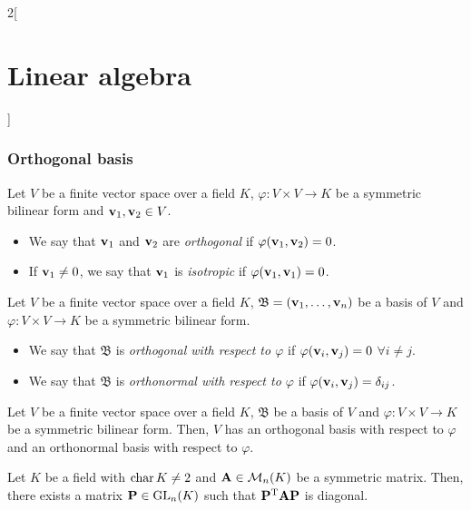 \documentclass[../../../main.tex]{subfiles}
\begin{document}
\begin{multicols}{2}[\section{Linear algebra}]
  \subsubsection*{Orthogonal basis}
  \begin{definition}\label{ALG-isotrop}
    Let $V$ be a finite vector space over a field $K$, $\varphi:V\times V\rightarrow K$ be a symmetric bilinear form and $\vb{v}_1,\vb{v}_2\in V$.
    \begin{itemize}
      \item We say that $\vb{v}_1$ and $\vb{v}_2$ are \textit{orthogonal} if $\varphi(\vb{v}_1,\vb{v}_2)=0$.
      \item If $\vb{v}_1\ne 0$, we say that $\vb{v}_1$ is \textit{isotropic} if $\varphi(\vb{v}_1,\vb{v}_1)=0$.
    \end{itemize}
  \end{definition}
  \begin{definition}
    Let $V$ be a finite vector space over a field $K$, $\mathfrak{B}=(\vb{v}_1,\ldots,\vb{v}_n)$ be a basis of $V$ and $\varphi:V\times V\rightarrow K$ be a symmetric bilinear form.
    \begin{itemize}
      \item We say that $\mathfrak{B}$ is \textit{orthogonal with respect to $\varphi$} if $\varphi(\vb{v}_i,\vb{v}_j)=0$ $\forall i\ne j$.
      \item We say that $\mathfrak{B}$ is \textit{orthonormal with respect to $\varphi$} if $\varphi(\vb{v}_i,\vb{v}_j)=\delta_{ij}$.
    \end{itemize}
  \end{definition}
  \begin{theorem}
    Let $V$ be a finite vector space over a field $K$, $\mathfrak{B}$ be a basis of $V$ and $\varphi:V\times V\rightarrow K$ be a symmetric bilinear form. Then, $V$ has an orthogonal basis with respect to $\varphi$ and an orthonormal basis with respect to $\varphi$.
  \end{theorem}
  \begin{corollary}
    Let $K$ be a field with $\operatorname{char} K\ne 2$ and $\vb{A}\in\mathcal{M}_n(K)$ be a symmetric matrix. Then, there exists a matrix $\vb{P}\in\mathrm{GL}_n(K)$ such that $\vb{P}^{\mathrm{T}}\vb{A}\vb{P}$ is diagonal.
  \end{corollary}

\end{multicols}
\end{document}
